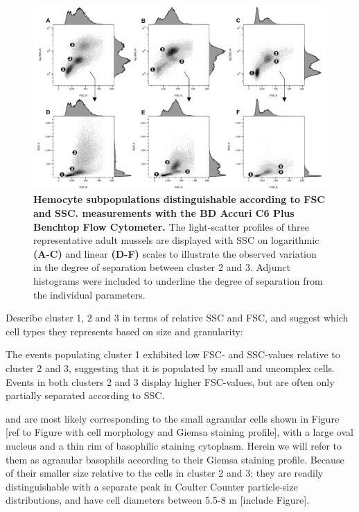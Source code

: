 \begin{figure}[!ht]
    \centering
    \includegraphics[width=1.0\textwidth]{figures/Gating strategy/scatter profiles 30k with let num.pdf}
    \caption{\textbf{Hemocyte subpopulations distinguishable according to FSC and SSC. measurements with the BD Accuri C6 Plus Benchtop Flow Cytometer.} The light-scatter profiles of three representative adult mussels are displayed with SSC on logarithmic \textbf{(A-C)} and linear \textbf{(D-F)} scales to illustrate the observed variation in the degree of separation between cluster 2 and 3. Adjunct histograms were included to underline the degree of separation from the individual parameters.}
    \label{fig:fsc_vs_ssc}
\end{figure}

Describe cluster 1, 2 and 3 in terms of relative SSC and FSC, and suggest which cell types they represents based on size and granularity:

The events populating cluster 1 exhibited low FSC- and SSC-values relative to cluster 2 and 3, suggesting that it is populated by small and uncomplex cells. Events in both clusters 2 and 3 display higher FSC-values, but are often only partially separated according to SSC.

and are most likely corresponding to the small agranular cells shown in Figure [ref to Figure with cell morphology and Giemsa staining profile], with a large oval nucleus and a thin rim of basophilic staining cytoplasm. Herein we will refer to them as agranular basophils according to their Giemsa staining profile. Because of their smaller size relative to the cells in cluster 2 and 3; they are readily distinguishable with a separate peak in Coulter Counter particle-size distributions, and have cell diameters between 5.5-8 \micro m [include Figure].

